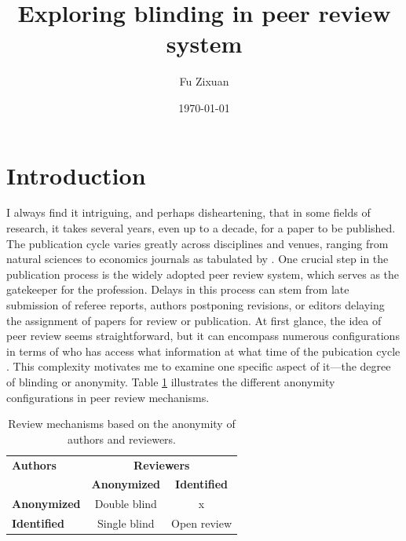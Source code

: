 \documentclass[12pt]{article}
\title{\textbf{Exploring blinding in peer review system}}
\author{Fu Zixuan}
\date{\today}
\begin{document}
\maketitle




\section{Introduction}
I always find it intriguing, and perhaps disheartening, that in some fields of
research, it takes several years, even up to a decade, for a paper to be
published. The publication cycle varies greatly across disciplines and venues,
ranging from natural sciences to economics journals as tabulated by
\citet{hadavand2024publishing}. One crucial step in the publication process is
the widely adopted peer review system, which serves as the gatekeeper for the
profession. Delays in this process can stem from late submission of referee
reports, authors postponing revisions, or editors delaying the assignment of
papers for review or publication. At first glance, the idea of peer review
seems straightforward, but it can encompass numerous configurations in terms of
who has access what information at what time of the pubication cycle
\citep{soergel2013open}. This complexity motivates me to examine one specific
aspect of it—the degree of blinding or anonymity. Table
\ref{tab:review_mechanism} illustrates the different anonymity configurations
in peer review mechanisms.

\begin{table}[h!]
    \centering
    \begin{tabular}{lcc}
        \toprule
        \textbf{Authors}    & \multicolumn{2}{c}{\textbf{Reviewers}}                       \\ \cmidrule(lr){2-3}
                            & \textbf{Anonymized}                    & \textbf{Identified} \\ \midrule
        \textbf{Anonymized} & Double blind                           & x                   \\
        \textbf{Identified} & Single blind                           & Open review         \\ \bottomrule
    \end{tabular}
    \caption{Review mechanisms based on the anonymity of authors and reviewers.}
    \label{tab:review_mechanism}
\end{table}
\end{document}
